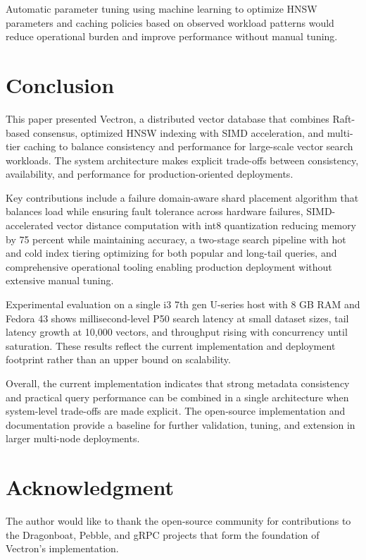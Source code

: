 \documentclass[conference]{IEEEtran}
\begin{document}
Automatic parameter tuning using machine learning to optimize HNSW parameters and caching policies based on observed workload patterns would reduce operational burden and improve performance without manual tuning.

\section{Conclusion}

This paper presented Vectron, a distributed vector database that combines Raft-based consensus, optimized HNSW indexing with SIMD acceleration, and multi-tier caching to balance consistency and performance for large-scale vector search workloads. The system architecture makes explicit trade-offs between consistency, availability, and performance for production-oriented deployments.

Key contributions include a failure domain-aware shard placement algorithm that balances load while ensuring fault tolerance across hardware failures, SIMD-accelerated vector distance computation with int8 quantization reducing memory by 75 percent while maintaining accuracy, a two-stage search pipeline with hot and cold index tiering optimizing for both popular and long-tail queries, and comprehensive operational tooling enabling production deployment without extensive manual tuning.

Experimental evaluation on a single i3 7th gen U-series host with 8 GB RAM and Fedora 43 shows millisecond-level P50 search latency at small dataset sizes, tail latency growth at 10,000 vectors, and throughput rising with concurrency until saturation. These results reflect the current implementation and deployment footprint rather than an upper bound on scalability.

Overall, the current implementation indicates that strong metadata consistency and practical query performance can be combined in a single architecture when system-level trade-offs are made explicit. The open-source implementation and documentation provide a baseline for further validation, tuning, and extension in larger multi-node deployments.

\section*{Acknowledgment}

The author would like to thank the open-source community for contributions to the Dragonboat, Pebble, and gRPC projects that form the foundation of Vectron's implementation.
\end{document}

